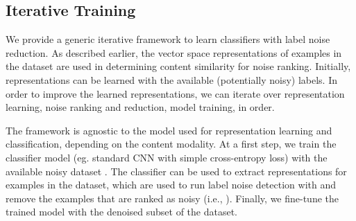 \subsection{Iterative Training}\label{sec:labelnet_classification}
We provide a generic iterative framework to learn classifiers with label noise reduction. As described earlier, the vector space representations of examples in the dataset are used in determining content similarity for noise ranking. Initially, representations can be learned with the available (potentially noisy) labels. In order to improve the learned representations, we can iterate over representation learning, noise ranking and reduction, model training, in order.

The framework is agnostic to the model used for representation learning and classification, depending on the content modality. At a first step, we train the classifier model (eg. standard CNN with simple cross-entropy loss) with the available noisy dataset . The classifier can be used to extract representations for examples in the dataset, which are used to run label noise detection with \algName and remove the examples that are ranked as noisy (i.e., ). Finally, we fine-tune the trained model with the denoised subset of the dataset. 








